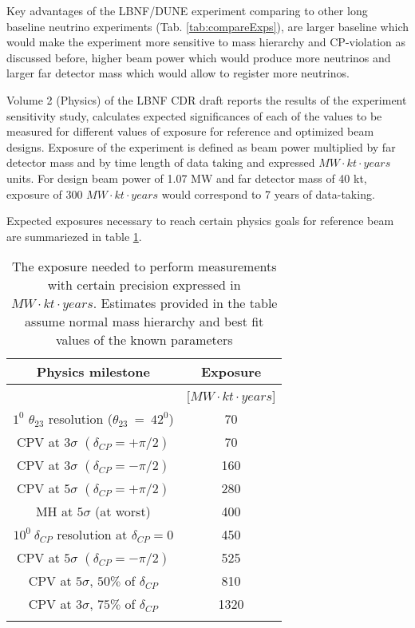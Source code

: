 Key advantages of the LBNF/DUNE experiment comparing to other long baseline neutrino experiments (Tab. \ref{tab:compareExps}), are larger baseline which would make the experiment more sensitive to mass hierarchy and CP-violation as discussed before, higher beam power which would produce more neutrinos and larger far detector mass which would allow to register more neutrinos. 

Volume 2 (Physics) of the LBNF CDR draft reports the results of the experiment sensitivity study, calculates expected significances of each of the values to be measured for different values of exposure for reference and optimized beam designs. Exposure of the experiment is defined as beam power multiplied by far detector mass and by time length of data taking and expressed   $MW \cdot kt \cdot years$ units. For design beam power of 1.07 MW and far detector mass of 40 kt, exposure of 300 $MW \cdot kt \cdot years$ would correspond to 7 years of data-taking.

Expected exposures necessary to reach certain physics goals for reference beam are summariezed in table \ref{tab:exposures_needed}.


\begin{table}[h]
  \centering
  \begin{center}
  \caption{ The exposure needed to perform measurements with certain precision expressed in $MW \cdot kt \cdot years$. Estimates provided in the table assume normal mass hierarchy and best fit values of the known parameters }
  \begin{tabular}{|c|c|}
  \hline  
  Physics milestone & Exposure  \\ \hline
   & [$MW \cdot kt \cdot years$]  \\ \hline
  $1^0$ $\theta_{23}$ resolution ($\theta_{23}~=~42^0$) & 70 \\ \hline
  CPV at $3\sigma$ $(\delta_{CP}=+\pi/2)$ & 70  \\ \hline
  CPV at $3\sigma$ $(\delta_{CP}=-\pi/2)$ & 160  \\ \hline
  CPV at $5\sigma$ $(\delta_{CP}=+\pi/2)$ & 280  \\ \hline
  MH at $5\sigma$ (at worst) & 400  \\ \hline
  $10^0~\delta_{CP}$ resolution at $\delta_{CP}=0$ & 450  \\ \hline
  CPV at $5\sigma$ $(\delta_{CP}=-\pi/2)$ & 525  \\ \hline
  CPV at $5\sigma$, $50\%$ of $\delta_{CP}$ & 810  \\ \hline
  CPV at $3\sigma$, $75\%$ of $\delta_{CP}$ & 1320  \\ \hline
  \label{tab:exposures_needed}
  \end{tabular}
  \end{center}
\end{table}

